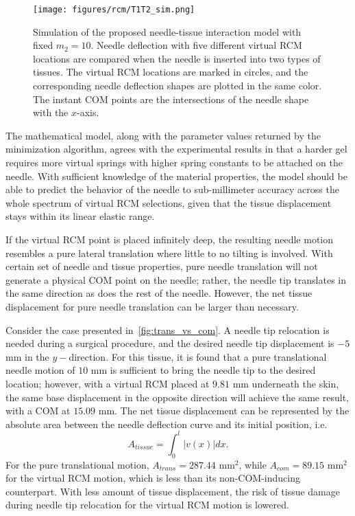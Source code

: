 \begin{figure}[tb]
  \centering
  \texttt{[image: figures/rcm/T1T2\_sim.png]}
  \caption{Simulation of the proposed needle-tissue interaction model with fixed $m_2 = 10$. Needle deflection with five different virtual RCM locations are compared when the needle is inserted into two types of tissues. The virtual RCM locations are marked in circles, and the corresponding needle deflection shapes are plotted in the same color. The instant COM points are the intersections of the needle shape with the $x$-axis.}
  \label{fig:T1T2_sim}
\end{figure}

The mathematical model, along with the parameter values returned by the minimization algorithm, agrees with the experimental results in that a harder gel requires more virtual springs with higher spring constants to be attached on the needle. With sufficient knowledge of the material properties, the model should be able to predict the behavior of the needle to sub-millimeter accuracy across the whole spectrum of virtual RCM selections, given that the tissue displacement stays within its linear elastic range.

If the virtual RCM point is placed infinitely deep, the resulting needle motion resembles a pure lateral translation where little to no tilting is involved. With certain set of needle and tissue properties, pure needle translation will not generate a physical COM point on the needle; rather, the needle tip translates in the same direction as does the rest of the needle. However, the net tissue displacement for pure needle translation can be larger than necessary.

Consider the case presented in~\cref{fig:trans_vs_com}. A needle tip relocation is needed during a surgical procedure, and the desired needle tip displacement is $-5$ mm in the $y-$direction. For this tissue, it is found that a pure translational needle motion of  $10$ mm is sufficient to bring the needle tip to the desired location; however, with a virtual RCM placed at $9.81$ mm underneath the skin, the same base displacement in the opposite direction will achieve the same result, with a COM at $15.09$ mm. The net tissue displacement can be represented by the absolute area between the needle deflection curve and its initial position, i.e.
\begin{equation}
  A_{tissue} = \int_0^{l}{|v(x)|}dx.
\end{equation}
For the pure translational motion, $A_{trans} = 287.44$ mm$^2$, while $A_{com} = 89.15$ mm$^2$ for the virtual RCM motion, which is less than its non-COM-inducing counterpart. With less amount of tissue displacement, the risk of tissue damage during needle tip relocation for the virtual RCM motion is lowered.

